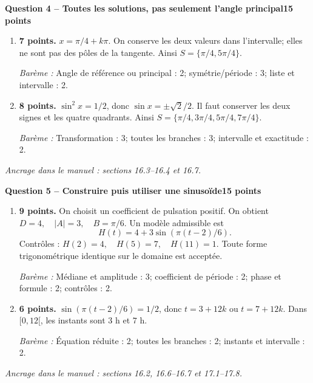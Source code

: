\documentclass[11pt,a4paper]{article}
\begin{document}
\newpage
{\large\bfseries Question 4 -- Toutes les solutions, pas seulement l’angle principal}\hfill\textbf{15 points}\par
\begin{enumerate}
\item \textbf{7 points.} \(x=\pi/4+k\pi\). On conserve les deux valeurs dans l’intervalle; elles ne sont pas des pôles de la tangente. Ainsi \(S=\{\pi/4,5\pi/4\}\).
\par{\small\textit{Barème : }Angle de référence ou principal : 2; symétrie/période : 3; liste et intervalle : 2.}
\item \textbf{8 points.} \(\sin^2x=1/2\), donc \(\sin x=\pm\sqrt2/2\). Il faut conserver les deux signes et les quatre quadrants. Ainsi \(S=\{\pi/4,3\pi/4,5\pi/4,7\pi/4\}\).
\par{\small\textit{Barème : }Transformation : 3; toutes les branches : 3; intervalle et exactitude : 2.}
\end{enumerate}
\vfill {\small\textit{Ancrage dans le manuel : sections 16.3--16.4 et 16.7.}}

\newpage
{\large\bfseries Question 5 -- Construire puis utiliser une sinusoïde}\hfill\textbf{15 points}\par
\begin{enumerate}
\item \textbf{9 points.} On choisit un coefficient de pulsation positif. On obtient \(D=4,\quad |A|=3,\quad B=\pi/6\). Un modèle admissible est \[H(t)=4+3\sin(\pi(t-2)/6).\] Contrôles : \(H(2)=4,\quad H(5)=7,\quad H(11)=1\). Toute forme trigonométrique identique sur le domaine est acceptée.
\par{\small\textit{Barème : }Médiane et amplitude : 3; coefficient de période : 2; phase et formule : 2; contrôles : 2.}
\item \textbf{6 points.} \(\sin(\pi(t-2)/6)=1/2\), donc \(t=3+12k\) ou \(t=7+12k\). Dans \([0,12[\), les instants sont \(3\) h et \(7\) h.
\par{\small\textit{Barème : }Équation réduite : 2; toutes les branches : 2; instants et intervalle : 2.}
\end{enumerate}
\vfill {\small\textit{Ancrage dans le manuel : sections 16.2, 16.6--16.7 et 17.1--17.8.}}
\end{document}
